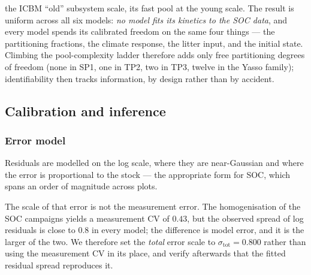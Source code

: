 \documentclass[11pt]{article}
\newif\ifstrat
\newcommand{\stratnote}[1]{\ifstrat{\color{red}#1}\fi}  %
\begin{document}
the ICBM ``old'' subsystem scale, its fast pool at the young scale. The result is
uniform across all six models: \emph{no model fits its kinetics to the SOC data},
and every model spends its calibrated freedom on the same four things --- the
partitioning fractions, the climate response, the litter input, and the initial
state. Climbing the pool-complexity ladder therefore adds only free partitioning
degrees of freedom (none in SP1, one in TP2, two in TP3, twelve in the Yasso
family); identifiability then tracks information, by design rather than by
accident.
\stratnote{[strand] This convention is also what makes the stratified extension
Yasso-only: with rates anchored, Yasso's stratifiable knobs are inputs + the
humus-formation fraction --- see the optional strand in the Outlook.}

\subsection{Calibration and inference}

\subsubsection{Error model}
Residuals are modelled on the log scale, where they are near-Gaussian and where
the error is proportional to the stock --- the appropriate form for SOC, which
spans an order of magnitude across plots.

The scale of that error is not the measurement error. The homogenisation of the
SOC campaigns yields a measurement CV of $0.43$, but the observed spread of log
residuals is close to $0.8$ in every model; the difference is model error, and
it is the larger of the two. We therefore set the \emph{total} error scale to
$\sigma_{\mathrm{tot}} = 0.800$ rather than using the measurement CV in its
place, and verify afterwards that the fitted residual spread reproduces it.
\end{document}
